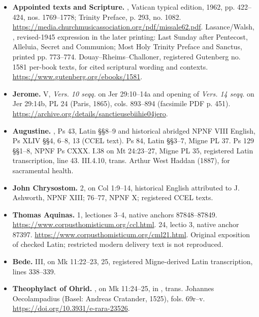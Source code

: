 \begin{itemize}
\item \textbf{Appointed texts and Scripture.}
, Vatican typical edition, 1962, pp. 422--424,
nos. 1769--1778; Trinity Preface, p. 293, no. 1082.
\url{https://media.churchmusicassociation.org/pdf/missale62.pdf}.
Lasance/Walsh, , revised-1945 expression
in the later printing: Last Sunday after Pentecost, Alleluia,
Secret and Communion; Most Holy Trinity Preface and Sanctus,
printed pp. 773--774.
Douay--Rheims--Challoner, registered Gutenberg no. 1581 per-book texts,
for cited scriptural wording and contexts.
\url{https://www.gutenberg.org/ebooks/1581}.

\item \textbf{Jerome.}  V, \textit{Vers. 10 seqq.}
on Jer 29:10--14a and opening of \textit{Vers. 14 seqq.} on Jer 29:14b,
PL 24 (Paris, 1865), cols. 893--894 (facsimile PDF p. 451).
\url{https://archive.org/details/sanctieusebiihie04jero}.

\item \textbf{Augustine.} ,
Ps 43, Latin §§8--9 and historical abridged NPNF VIII English,
Ps XLIV §§4, 6--8, 13 (CCEL text). Ps 84, Latin §§3--7,
Migne PL 37. Ps 129 §§1--8, NPNF Ps CXXX.
 I.38 on Mt 24:23--27,
Migne PL 35, registered Latin transcription, line 43.
 III.4.10, trans. Arthur West Haddan (1887),
for sacramental health.

\item \textbf{John Chrysostom.}  2,
on Col 1:9--14, historical English attributed to J. Ashworth,
NPNF XIII;  76--77, NPNF X;
registered CCEL texts.

\item \textbf{Thomas Aquinas.}  1,
lectiones 3--4, native anchors 87848--87849.
\url{https://www.corpusthomisticum.org/ccl.html}.
 24, lectio 3, native anchor 87397.
\url{https://www.corpusthomisticum.org/cml21.html}.
Original exposition of checked Latin; restricted modern delivery
text is not reproduced.

\item \textbf{Bede.}  III,
on Mk 11:22--23, 25, registered Migne-derived Latin transcription,
lines 338--339.

\item \textbf{Theophylact of Ohrid.} , on Mk 11:24--25,
in , trans. Johannes
Oecolampadius (Basel: Andreas Cratander, 1525), fols. 69r--v.
\url{https://doi.org/10.3931/e-rara-23526}.


\end{itemize}
